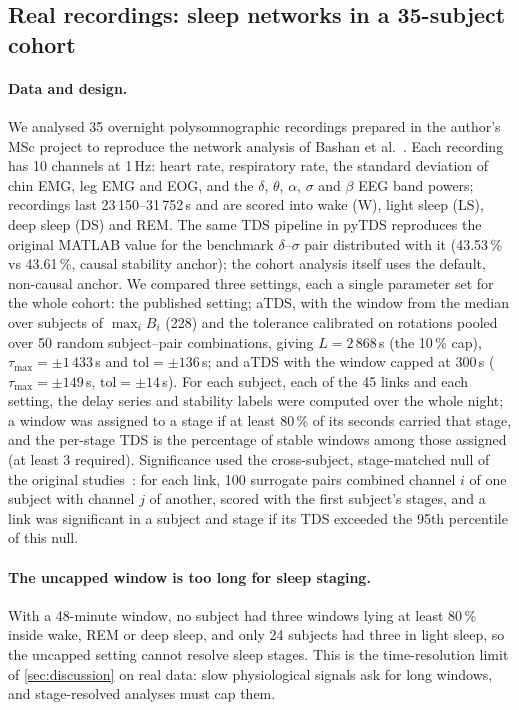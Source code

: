 \documentclass[11pt,a4paper]{article}
\begin{document}
\subsection{Real recordings: sleep networks in a 35-subject cohort}
\label{sec:res-cohort}
\paragraph{Data and design.} We analysed 35 overnight polysomnographic recordings prepared in the author's MSc project to reproduce the network analysis of Bashan et al.~\cite{Bashan2012NetworkPhysiology}. Each recording has 10 channels at 1\,Hz: heart rate, respiratory rate, the standard deviation of chin EMG, leg EMG and EOG, and the $\delta$, $\theta$, $\alpha$, $\sigma$ and $\beta$ EEG band powers; recordings last 23\,150--31\,752\,s and are scored into wake (W), light sleep (LS), deep sleep (DS) and REM. The same TDS pipeline in pyTDS reproduces the original MATLAB value for the benchmark $\delta$--$\sigma$ pair distributed with it (43.53\,\% vs 43.61\,\%, causal stability anchor); the cohort analysis itself uses the default, non-causal anchor. We compared three settings, each a single parameter set for the whole cohort: the published setting; aTDS, with the window from the median over subjects of $\max_i B_i$ (228) and the tolerance calibrated on rotations pooled over 50 random subject--pair combinations, giving $L = 2\,868$\,s (the 10\,\% cap), $\tau_{\max} = \pm1\,433$\,s and $\mathrm{tol} = \pm136$\,s; and aTDS with the window capped at 300\,s ($\tau_{\max} = \pm149$\,s, $\mathrm{tol} = \pm14$\,s). For each subject, each of the 45 links and each setting, the delay series and stability labels were computed over the whole night; a window was assigned to a stage if at least 80\,\% of its seconds carried that stage, and the per-stage TDS is the percentage of stable windows among those assigned (at least 3 required). Significance used the cross-subject, stage-matched null of the original studies~\cite{Bashan2012NetworkPhysiology}: for each link, 100 surrogate pairs combined channel $i$ of one subject with channel $j$ of another, scored with the first subject's stages, and a link was significant in a subject and stage if its TDS exceeded the 95th percentile of this null.

\paragraph{The uncapped window is too long for sleep staging.} With a 48-minute window, no subject had three windows lying at least 80\,\% inside wake, REM or deep sleep, and only 24 subjects had three in light sleep, so the uncapped setting cannot resolve sleep stages. This is the time-resolution limit of \cref{sec:discussion} on real data: slow physiological signals ask for long windows, and stage-resolved analyses must cap them.
\end{document}
